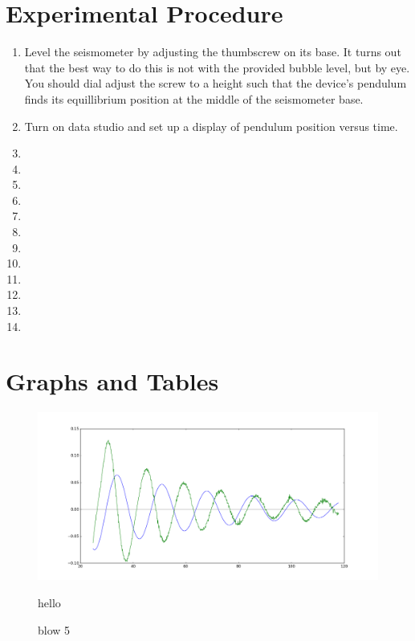 \documentclass{amsart}
\begin{document}
\section{Experimental Procedure}
\begin{enumerate}
\item Level the seismometer by adjusting the thumbscrew on its base. It turns out that the best way to do this is not with the provided bubble level, but by eye. You should dial adjust the screw to a height such that the device's pendulum finds its equillibrium position at the middle of the seismometer base.
\item Turn on data studio and set up a display of pendulum position versus time.
\item
\item
\item
\item
\item
\item
\item
\item
\item
\item
\item
\item
\end{enumerate}

\newpage

\newpage

\section{Graphs and Tables}

\begin{figure}
    \begin{minipage}{.45\textwidth}
        \includegraphics[width=\textwidth]{blow5.png}
        \caption{blow 5}
    \end{minipage}
    \begin{minipage}{.45\textwidth}
        hello
    \end{minipage}
\end{figure}
\end{document}
